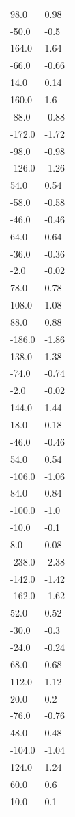 \begin{longtable}{ll}
98.0 & 0.98 \\
-50.0 & -0.5 \\
164.0 & 1.64 \\
-66.0 & -0.66 \\
14.0 & 0.14 \\
160.0 & 1.6 \\
-88.0 & -0.88 \\
-172.0 & -1.72 \\
-98.0 & -0.98 \\
-126.0 & -1.26 \\
54.0 & 0.54 \\
-58.0 & -0.58 \\
-46.0 & -0.46 \\
64.0 & 0.64 \\
-36.0 & -0.36 \\
-2.0 & -0.02 \\
78.0 & 0.78 \\
108.0 & 1.08 \\
88.0 & 0.88 \\
-186.0 & -1.86 \\
138.0 & 1.38 \\
-74.0 & -0.74 \\
-2.0 & -0.02 \\
144.0 & 1.44 \\
18.0 & 0.18 \\
-46.0 & -0.46 \\
54.0 & 0.54 \\
-106.0 & -1.06 \\
84.0 & 0.84 \\
-100.0 & -1.0 \\
-10.0 & -0.1 \\
8.0 & 0.08 \\
-238.0 & -2.38 \\
-142.0 & -1.42 \\
-162.0 & -1.62 \\
52.0 & 0.52 \\
-30.0 & -0.3 \\
-24.0 & -0.24 \\
68.0 & 0.68 \\
112.0 & 1.12 \\
20.0 & 0.2 \\
-76.0 & -0.76 \\
48.0 & 0.48 \\
-104.0 & -1.04 \\
124.0 & 1.24 \\
60.0 & 0.6 \\
10.0 & 0.1 \\

\end{longtable}
